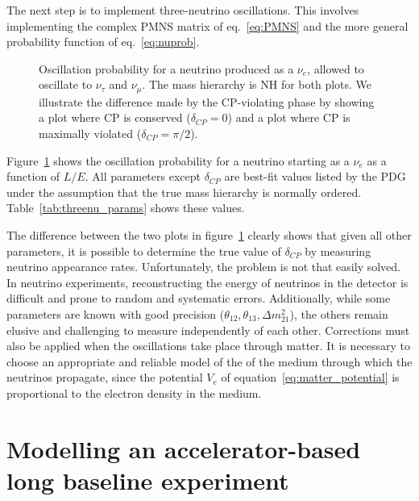 The next step is to implement three-neutrino oscillations. This involves
implementing the complex PMNS matrix of eq.~\ref{eq:PMNS} and the more general
probability function of eq.~\ref{eq:nuprob}. 
\begin{figure}
	\centering
\caption{Oscillation probability for a neutrino produced as a $\nu_e$, allowed to
	oscillate to $\nu_\tau$ and $\nu_\mu$. The mass hierarchy is NH for both
	plots. We illustrate the difference made by
	the CP-violating phase by showing a plot where CP is conserved
	($\delta_{CP}=0$) and a plot where CP is maximally violated ($\delta_{CP} =
	\pi/2$).}
\label{fig:threenu_plots}
\end{figure}
Figure~\ref{fig:threenu_plots} shows the oscillation probability for a neutrino
starting as a $\nu_e$ as a function of $L/E$. All parameters except
$\delta_{CP}$ are best-fit values listed by the PDG\cite{pdg} under the
assumption that the true mass hierarchy is normally ordered.
Table~\ref{tab:threenu_params} shows these values.


The difference between the two plots in figure~\ref{fig:threenu_plots} clearly
shows that given all other parameters, it is possible to determine the true
value of $\delta_{CP}$ by measuring neutrino appearance rates. Unfortunately,
the problem is not that easily solved. In neutrino experiments, reconstructing
the energy of neutrinos in the detector is difficult and prone to random and
systematic errors. Additionally, while some parameters are known with good
precision ($\theta_{12}, \theta_{13}, \Delta m^2_{21}$), the others remain
elusive and challenging to measure independently of each other.
Corrections must also be applied when the oscillations take place
through matter. It is necessary to choose an appropriate and reliable model of the
of the medium through which the neutrinos propagate, since the potential $V_e$ of
equation~\ref{eq:matter_potential} is proportional to the electron density in
the medium.


\section{Modelling an accelerator-based long baseline experiment}

